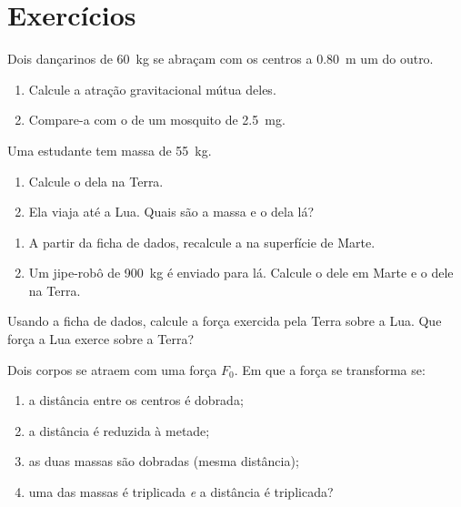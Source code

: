 \section{Exercícios}

\begin{exercise}[$\star$]\label{exo:g10:universal-gravitation:1}
Dois dançarinos de \qty{60}{kg} se abraçam com os centros a
\qty{0.80}{m} um do outro.
\begin{enumerate}
  \item Calcule a atração gravitacional mútua deles.
  \item Compare-a com o  de um mosquito de \qty{2.5}{mg}.
\end{enumerate}
\end{exercise}

\begin{exercise}[$\star$]\label{exo:g10:universal-gravitation:2}
Uma estudante tem massa de \qty{55}{kg}.
\begin{enumerate}
  \item Calcule o  dela na Terra.
  \item Ela viaja até a Lua. Quais são a massa e o  dela lá?
\end{enumerate}
\end{exercise}

\begin{exercise}[$\star$]\label{exo:g10:universal-gravitation:3}
\begin{enumerate}
  \item A partir da ficha de dados, recalcule a  na superfície de Marte.
  \item Um jipe-robô de \qty{900}{kg} é enviado para lá. Calcule o 
        dele em Marte e o  dele na Terra.
\end{enumerate}
\end{exercise}

\begin{exercise}[$\star$]\label{exo:g10:universal-gravitation:4}
Usando a ficha de dados, calcule a força exercida pela Terra sobre a Lua.
Que força a Lua exerce sobre a Terra?
\end{exercise}

\begin{exercise}[$\star$]\label{exo:g10:universal-gravitation:5}
Dois corpos se atraem com uma força $F_0$. Em que a força se transforma
se:
\begin{enumerate}
  \item a distância entre os centros é dobrada;
  \item a distância é reduzida à metade;
  \item as duas massas são dobradas (mesma distância);
  \item uma das massas é triplicada \emph{e} a distância é triplicada?
\end{enumerate}
\end{exercise}

